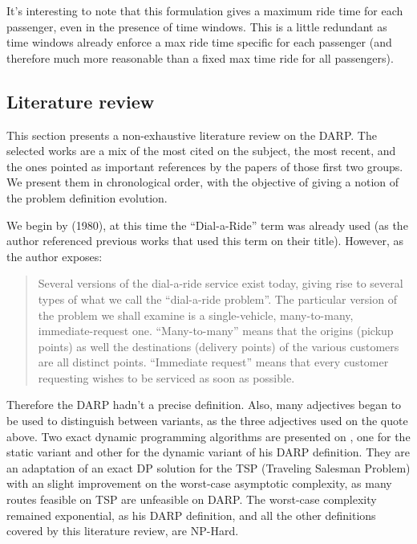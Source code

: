 \documentclass[english,plano-doutorado,twoside]{iiufrgs}
\begin{document}
It's interesting to note that this formulation gives a maximum ride time for each passenger, even in the presence of time windows. This is a little redundant as time windows already enforce a max ride time specific for each passenger (and therefore much more reasonable than a fixed max time ride for all passengers).

\subsection{Literature review}

This section presents a non-exhaustive literature review on the DARP. The selected works are a mix of the most cited on the subject, the most recent, and the ones pointed as important references by the papers of those first two groups. We present them in chronological order, with the objective of giving a notion of the problem definition evolution.

We begin by \cite{psaraftis_dynamic_1980} (1980), at this time the ``Dial-a-Ride'' term was already used (as the author referenced previous works that used this term on their title). However, as the author exposes:
\begin{quotation}
Several versions of the dial-a-ride service exist today, giving rise to several types of what we call the ``dial-a-ride problem''. The particular version of the problem we shall examine is a single-vehicle, many-to-many, immediate-request one. ``Many-to-many'' means that the origins (pickup points) as well the destinations (delivery points) of the various customers are all distinct points. ``Immediate request'' means that every customer requesting wishes to be serviced as soon as possible.
\end{quotation}
Therefore the DARP hadn't a precise definition. Also, many adjectives began to be used to distinguish between variants, as the three adjectives used on the quote above. Two exact dynamic programming algorithms are presented on \cite{psaraftis_dynamic_1980}, one for the static variant and other for the dynamic variant of his DARP definition. They are an adaptation of an exact DP solution for the TSP (Traveling Salesman Problem) with an slight improvement on the worst-case asymptotic complexity, as many routes feasible on TSP are unfeasible on DARP. The worst-case complexity remained exponential, as his DARP definition, and all the other definitions covered by this literature review, are NP-Hard.
\end{document}
